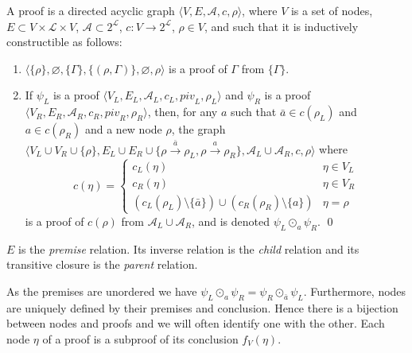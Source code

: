 \documentclass{llncs}
\newcommand{\dual}[1]{{\ensuremath{\bar{#1}}}}
\begin{document}
\newcommand{\clause}{c}
\newcommand{\pivot}{\mathit{piv}}


\begin{definition}[Proof] \label{def:proof}
A proof is a directed acyclic graph
$\langle 
V, 
E, 
\mathcal{A},
\clause, 
\rho
\rangle$, 
where $V$ is a set of nodes, $E \subset V \times \mathcal{L} \times V$, 
$\mathcal{A} \subset 2^\mathcal{L}$,
$\clause : V \longrightarrow 2^\mathcal{L}$, 
$\rho \in V$, and such that it is inductively constructible as follows:
\begin{enumerate}
  \item $\langle \{\rho\}, \varnothing, \{ \Gamma \}, \{ (\rho, \Gamma) \}, \varnothing,  \rho \rangle$ 
    is a proof of $\Gamma$ from $\{ \Gamma \}$.
  \item If $\psi_L$ is a proof $\langle V_L, E_L, \mathcal{A}_L, \clause_L, \pivot_L, \rho_L \rangle$ and
    $\psi_R$ is a proof $\langle V_R, E_R, \mathcal{A}_R, \clause_R, \pivot_R, \rho_R \rangle$, then, for any $a$ such that $\dual{a} \in \clause(\rho_L)$ and $a
    \in \clause(\rho_R)$ and a new node $\rho$, the graph 
    $\langle 
    V_L \cup V_R \cup \{\rho\},
    E_L \cup E_R \cup \{\rho \xrightarrow{\dual{a}} \rho_L, \rho \xrightarrow{a} \rho_R\}, 
    \mathcal{A}_L \cup \mathcal{A}_R,
    \clause,
    \rho
    \rangle$ where
    \begin{equation*}
      \clause(\eta) = \begin{cases}
        \clause_L(\eta) & \eta \in V_L \\
        \clause_R(\eta) & \eta \in V_R \\
        (\clause_L(\rho_L) \setminus \{\dual{a}\}) \cup (\clause_R(\rho_R) \setminus \{a\}) &
          \eta = \rho
      \end{cases}
    \end{equation*}
    is a proof of $\clause(\rho)$ from $\mathcal{A}_L \cup \mathcal{A}_R$, and is denoted $\psi_L \odot_a \psi_R$.
  \qed
\end{enumerate}
\end{definition}

$E$ is the \emph{premise} relation. Its inverse relation is the \emph{child} relation and its
transitive closure is the \emph{parent} relation. 

As the premises are unordered we have $\psi_L \odot_a \psi_R = \psi_R \odot_\dual{a} \psi_L$.
Furthermore, nodes are uniquely defined by their premises and conclusion. Hence there is a bijection
between nodes and proofs and we will often identify one with the other. Each node $\eta$ of a proof
is a subproof of its conclusion $f_V(\eta)$.
\end{document}
